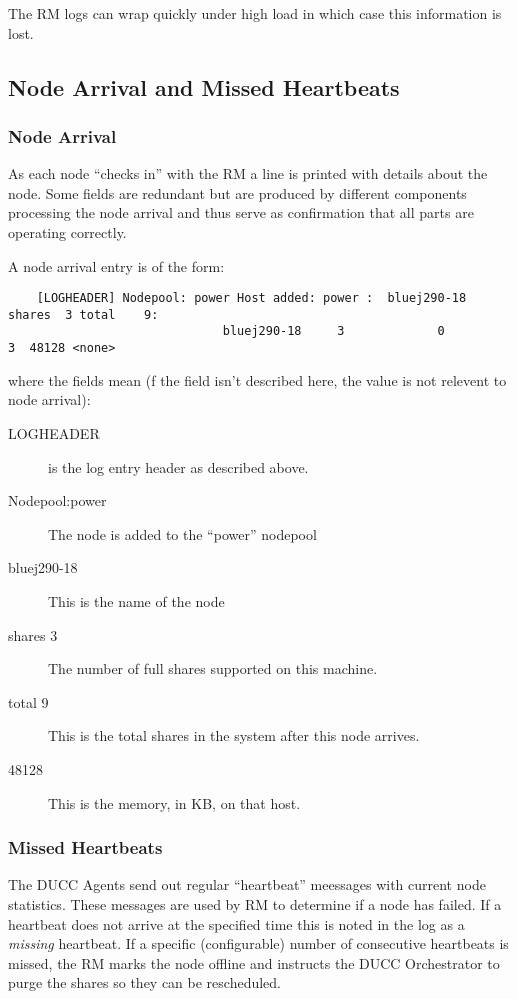    The RM logs can wrap quickly under high load in which case this information is lost.

\subsection{Node Arrival and Missed Heartbeats}
\subsubsection{Node Arrival}
    As each node ``checks in'' with the RM a line is printed with details about the node.  Some fields
    are redundant but are produced by different components processing the node arrival and thus serve
    as confirmation that all parts are operating correctly.

    A node arrival entry is of the form:
\begin{verbatim}
    [LOGHEADER] Nodepool: power Host added: power :  bluej290-18   shares  3 total    9:          
                              bluej290-18     3             0             3  48128 <none>
\end{verbatim}
    where the fields mean (f the field isn't described here, the value is not relevent to node arrival):
    \begin{description}
      \item[LOGHEADER] is the log entry header as described above.
      \item[Nodepool:power] The node is added to the ``power'' nodepool
      \item[bluej290-18] This is the name of the node
      \item[shares 3] The number of full shares supported on this machine.
      \item[total 9] This is the total shares in the system after this node arrives.
      \item[48128] This is the memory, in KB, on that host.
    \end{description}

\subsubsection{Missed Heartbeats}
    The DUCC Agents send out regular ``heartbeat'' meessages with current node statistics. These
    messages are used by RM to determine if a node has failed.  If a heartbeat does not arrive
    at the specified time this is noted in the log as a {\em missing} heartbeat. If a specific (configurable) number
    of consecutive heartbeats is missed, the RM marks the node offline and instructs the
    DUCC Orchestrator to purge the shares so they can be rescheduled.

